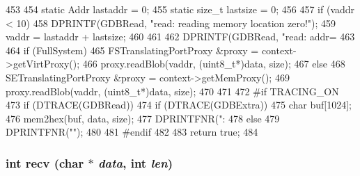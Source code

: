 \begin{DoxyCode}
453 {
454     static Addr lastaddr = 0;
455     static size_t lastsize = 0;
456 
457     if (vaddr < 10) {
458       DPRINTF(GDBRead, "read:  reading memory location zero!\n");
459       vaddr = lastaddr + lastsize;
460     }
461 
462     DPRINTF(GDBRead, "read:  addr=%
463 
464     if (FullSystem) {
465         FSTranslatingPortProxy &proxy = context->getVirtProxy();
466         proxy.readBlob(vaddr, (uint8_t*)data, size);
467     } else {
468         SETranslatingPortProxy &proxy = context->getMemProxy();
469         proxy.readBlob(vaddr, (uint8_t*)data, size);
470     }
471 
472 #if TRACING_ON
473     if (DTRACE(GDBRead)) {
474         if (DTRACE(GDBExtra)) {
475             char buf[1024];
476             mem2hex(buf, data, size);
477             DPRINTFNR(": %
478         } else
479             DPRINTFNR("\n");
480     }
481 #endif
482 
483     return true;
484 }
\end{DoxyCode}
\hypertarget{classBaseRemoteGDB_ad39aca9b61a4b34960108fd7c70a40ef}{
\subsubsection[{recv}]{\setlength{\rightskip}{0pt plus 5cm}int recv (char $\ast$ {\em data}, \/  int {\em len})}}
\label{classBaseRemoteGDB_ad39aca9b61a4b34960108fd7c70a40ef}



